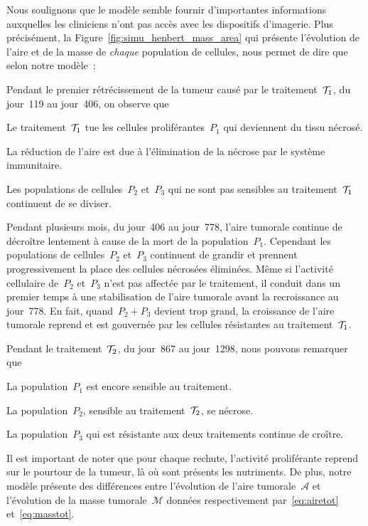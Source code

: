 \documentclass[main.tex]{subfiles}
\begin{document}
Nous soulignons que le modèle semble fournir d'importantes informations auxquelles les cliniciens n'ont pas accès avec les dispositifs d'imagerie. Plus précisément, la  Figure~\ref{fig:simu_henbert_mass_area} qui présente l'évolution de l'aire et de la masse  de  \emph{chaque} population de cellules, nous permet de dire que selon notre modèle~: 
\begin{myitemize}
\item Pendant le premier rétrécissement de la tumeur causé par le 
traitement~${\mathcal T_1}$, du jour~119 au jour~406, on observe que
\begin{myenumerate}[label=\roman*)]
\item Le traitement~${\mathcal T_1}$ tue les cellules proliférantes~$P_1$ qui deviennent du tissu nécrosé. 
\item La réduction de l'aire est due à l'élimination de la nécrose par le système immunitaire. 
\item Les populations de cellules~$P_2$ et~$P_3$ qui ne sont pas sensibles au traitement~${\mathcal T_1}$ continuent de se diviser.
\end{myenumerate}
\item Pendant plusieurs mois, du jour~406 au jour~778, l'aire tumorale continue de décroître lentement à cause de la mort de la population~$P_1$. Cependant les populations de cellules~$P_2$ et~$P_3$ continuent de grandir et prennent progressivement la place des cellules nécrosées éliminées.  Même si l'activité cellulaire de~$P_2$ et~$P_3$ n'est pas affectée par le traitement, il conduit dans un premier temps à une stabilisation de l'aire tumorale avant la recroissance au 
jour~778. En fait, quand~$P_2+P_3$ devient trop grand, la croissance de l'aire tumorale reprend et est gouvernée par les cellules résistantes au traitement~${\mathcal T_1}$.
\item Pendant le traitement~${\mathcal T_2}$, du jour~867 au jour~1298, nous pouvons remarquer que 
\begin{myenumerate}[label=\roman*)]
\item La population~$P_1$ est encore sensible au traitement. 
\item La population~$P_2$, sensible au traitement~${\mathcal T_2}$, se nécrose.
\item La population~$P_3$ qui est résistante aux deux traitements continue de croître.
\end{myenumerate}
\end{myitemize}

Il est important de noter que pour chaque rechute, l'activité proliférante reprend sur le pourtour de la tumeur, là où sont présents les nutriments. 
De plus, notre modèle présente des différences entre l'évolution de l'aire tumorale~$\mathcal{A}$ et l'évolution de la masse tumorale~$\mathcal{M}$ données respectivement par~\eqref{eq:airetot} et~\eqref{eq:masstot}. 
\end{document}
